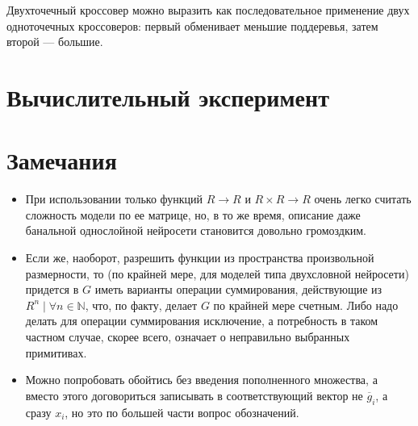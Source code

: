 \documentclass[12pt,a4paper]{amsart}
\begin{document}
Двухточечный кроссовер можно выразить как последовательное применение двух одноточечных кроссоверов: первый обменивает
меньшие поддеревья, затем второй --- большие.

\section{Вычислительный эксперимент}

\section{Замечания}

\begin{itemize}
  \item При использовании только функций $R \to R$ и $R \times R \to R$ очень легко считать сложность модели по ее
	матрице, но, в то же время, описание даже банальной однослойной нейросети становится довольно громоздким.
  \item Если же, наоборот, разрешить функции из пространства произвольной размерности, то (по крайней мере, для моделей
	типа двухсловной нейросети) придется в $G$ иметь варианты операции суммирования, действующие из
	$R^n \mid \forall n \in \mathbb{N}$, что, по факту, делает $G$ по крайней мере счетным. Либо надо делать для
	операции суммирования исключение, а потребность в таком частном случае, скорее всего, означает о неправильно
	выбранных примитивах.
  \item Можно попробовать обойтись без введения пополненного множества, а вместо этого договориться записывать в
	соответствующий вектор не $\overline{g}_i$, а сразу $x_i$, но это по большей части вопрос обозначений.
\end{itemize}


\extrasrussian

\end{document}

